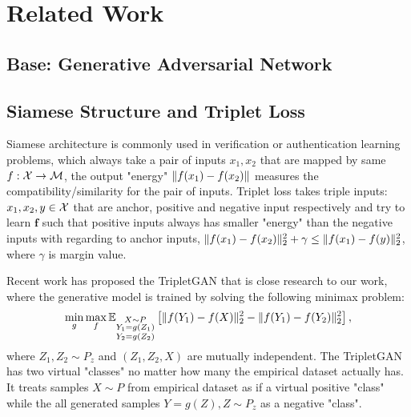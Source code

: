 \section{Related Work}


\subsection{Base: Generative Adversarial Network}


\subsection{Siamese Structure and Triplet Loss}

Siamese architecture is commonly used in verification or
authentication learning problems\cite{1467314}, which always take a
pair of inputs $x_1, x_2$ that are mapped by same $f: \mathcal{X} \rightarrow
\mathcal{M}$, the output "energy" $\| f(x_1) - f(x_2) \|$ measures the
compatibility/similarity for the pair of inputs.
Triplet loss \cite{7298682} takes triple inputs: $x_1, x_2, y \in \mathcal{X}$
that are anchor, positive and negative input respectively and try to
learn $\bm{f}$ such that positive inputs always has smaller "energy" than
the negative inputs with regarding to anchor inputs,
$\| f(x_1)-f(x_2) \|_{2}^2 + \gamma \le \| f(x_1)-f(y) \|_{2}^2$, 
where $\gamma$ is margin value.


Recent work \cite{2017arXiv171105084C} has proposed 
the TripletGAN that is close research to
our work, where the generative model is trained by solving the
following minimax problem:
\begin{equation}
  \min_{g} \max_{f} \mathbb{E}_{{\substack{X\sim P \\ Y_1= g(Z_1)\\ Y_2 = g(Z_2)}}}\left[ \| f(Y_1)-f(X) \|_{2}^2 - \| f(Y_1)-f(Y_2) \|_{2}^2 \right],
\end{equation}
where $Z_1, Z_2 \sim P_z$ and $(Z_1,Z_2,X)$ are mutually independent. The TripletGAN has two virtual
"classes" no matter how many the empirical dataset actually has. It treats samples
$X\sim P$ from empirical dataset as if a virtual positive "class" while the all
generated samples $Y=g(Z), Z\sim P_z$ as a negative "class". 

